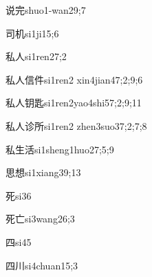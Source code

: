 \begin{verbete}{说完}{shuo1-wan2}{9;7}
\end{verbete}

\begin{verbete}{司机}{si1ji1}{5;6}
\end{verbete}

\begin{verbete}{私人}{si1ren2}{7;2}
\end{verbete}

\begin{verbete}{私人信件}{si1ren2 xin4jian4}{7;2;9;6}
\end{verbete}

\begin{verbete}{私人钥匙}{si1ren2yao4shi5}{7;2;9;11}
\end{verbete}

\begin{verbete}{私人诊所}{si1ren2 zhen3suo3}{7;2;7;8}
\end{verbete}

\begin{verbete}{私生活}{si1sheng1huo2}{7;5;9}
\end{verbete}

\begin{verbete}{思想}{si1xiang3}{9;13}
\end{verbete}

\begin{verbete}{死}{si3}{6}
\end{verbete}

\begin{verbete}{死亡}{si3wang2}{6;3}
\end{verbete}

\begin{verbete}{四}{si4}{5}
\end{verbete}

\begin{verbete}{四川}{si4chuan1}{5;3}
\end{verbete}

